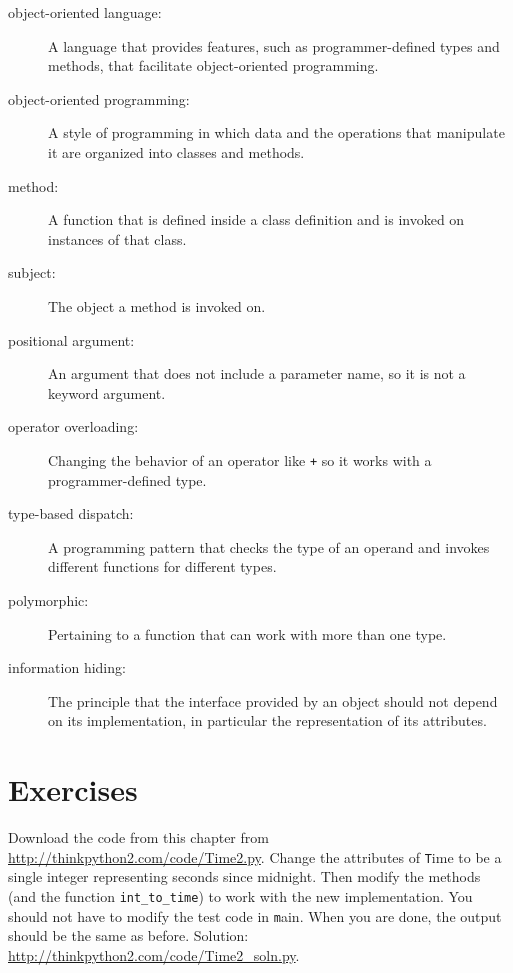 \documentclass[
DIV=11,
fontsize=12,
twoside,
headinclude=false,
titlepage=firstiscover,
abstract=true,
headsepline=true,
footsepline=true,
chapterprefix=true, %
headings=big,
bibliography=totoc,%
captions=tableheading
]{scrbook}
\theoremstyle{definition}
\begin{document}
\begin{description}

\item[object-oriented language:] A language that provides features,
  such as programmer-defined types and methods, that facilitate
  object-oriented programming.

\item[object-oriented programming:] A style of programming in which
data and the operations that manipulate it are organized into classes
and methods.

\item[method:] A function that is defined inside a class definition and
is invoked on instances of that class.

\item[subject:] The object a method is invoked on.

\item[positional argument:]  An argument that does not include
a parameter name, so it is not a keyword argument.

\item[operator overloading:] Changing the behavior of an operator like
{\texttt +} so it works with a programmer-defined type.

\item[type-based dispatch:] A programming pattern that checks the type
of an operand and invokes different functions for different types.

\item[polymorphic:] Pertaining to a function that can work with more
  than one type.  

\item[information hiding:] The principle that the interface provided 
by an object should not depend on its implementation, in particular
the representation of its attributes.

\end{description}


\section{Exercises}

\begin{exercise}
\normalfont

Download the code from this chapter from
\url{http://thinkpython2.com/code/Time2.py}.  Change the attributes of
    {\texttt Time} to be a single integer representing seconds since
    midnight.  Then modify the methods (and the function
    \verb"int_to_time") to work with the new implementation.  You
    should not have to modify the test code in {\texttt main}.  When you
    are done, the output should be the same as before.  Solution:
    \url{http://thinkpython2.com/code/Time2_soln.py}.

\end{exercise}
\end{document}
